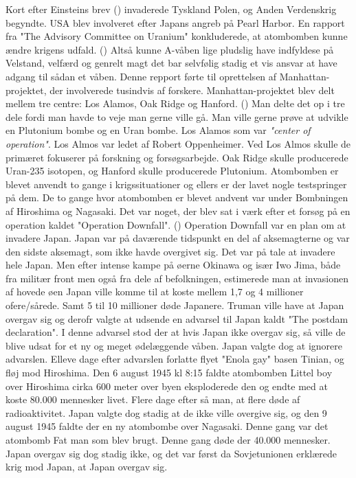 Kort efter Einsteins brev (\cite{EinsteinLetter}) invaderede Tyskland Polen, og Anden Verdenskrig begyndte. USA blev involveret efter Japans angreb på Pearl Harbor. En rapport fra "The Advisory Committee on Uranium" konkluderede, at atombomben kunne ændre krigens udfald. (\cite{timeline}) Altså kunne A-våben lige pludslig have indfyldese på Velstand, velfærd og genrelt magt det bar selvfølig stadig et vis ansvar at have adgang til sådan et våben. Denne repport førte til oprettelsen af Manhattan-projektet, der involverede tusindvis af forskere. Manhattan-projektet blev delt mellem tre centre:  Los Alamos, Oak Ridge og Hanford. (\cite{NPS}) Man delte det op i tre dele fordi man havde to veje man gerne ville gå. Man ville gerne prøve at udvikle en Plutonium bombe og en Uran bombe. Los Alamos som var \emph{"center of operation"}. Los Almos var ledet af Robert Oppenheimer. Ved Los Almos skulle de primæret fokuserer på forskning og forsøgsarbejde. Oak Ridge skulle producerede Uran-235 isotopen, og Hanford skulle producerede Plutonium. Atombomben er blevet anvendt to gange i krigssituationer og ellers er der lavet nogle testspringer på dem. De to gange hvor atombomben er blevet andvent var under Bombningen af Hiroshima og Nagasaki. Det var noget, der blev sat i værk efter et forsøg på en operation kaldet "Operation Downfall". (\cite{OperationsDownfall}) Operation Downfall var en plan om at invadere Japan. Japan var på daværende tidspunkt en del af aksemagterne og var den sidste aksemagt, som ikke havde overgivet sig. Det var på tale at invadere hele Japan. Men efter intense kampe på øerne Okinawa og især Iwo Jima, både fra militær front men også fra dele af befolkningen, estimerede man at invasionen af hovede øen Japan ville komme til at koste mellem 1,7 og 4 millioner ofere/sårede. Samt 5 til 10 millioner døde Japanere. Truman ville have at Japan overgav sig og derofr valgte at udsende en advarsel til Japan kaldt "The postdam declaration". I denne advarsel stod der at hvis Japan ikke overgav sig, så ville de blive udsat for et ny og meget ødelæggende våben. Japan valgte dog at ignorere advarslen. Elleve dage efter advarslen forlatte flyet "Enola gay" basen Tinian, og fløj mod Hiroshima. Den 6 august 1945 kl 8:15 faldte atombomben Littel boy over Hiroshima cirka 600 meter over byen eksploderede den og endte med at koste 80.000 mennesker livet. Flere dage efter så man, at flere døde af radioaktivitet. Japan valgte dog stadig at de ikke ville overgive sig, og den 9 august 1945 faldte der en ny atombombe over Nagasaki. Denne gang var det atombomb Fat man som blev brugt. Denne gang døde der 40.000 mennesker. Japan overgav sig dog stadig ikke, og det var først da Sovjetunionen erklærede krig mod Japan, at Japan overgav sig.

